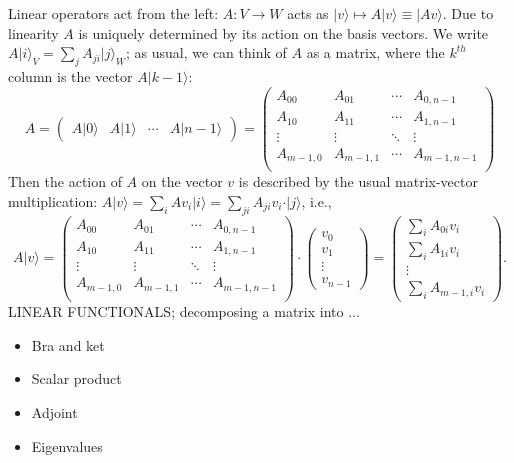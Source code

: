 \documentclass{article}
\theoremstyle{definition}
\newcommand{\ket}[1]{\vert #1 \rangle}
\begin{document}
Linear operators act from the left: $A: V\to W$ acts as $\ket{v}\mapsto A\ket{v} \equiv \ket{Av}$. Due to linearity $A$ is uniquely determined by its action on the basis vectors. We write $A\ket{i}_V = \sum_{j} A_{ji} \ket{j}_W$; as usual, we can think of $A$ as a matrix, where the $k^{th}$ column is the vector $A\ket{k-1}$:
\begin{equation*}
  A = \begin{pmatrix} A\ket{0} & A\ket{1} & \cdots & A\ket{n-1} \end{pmatrix} = 
  \begin{pmatrix}
    A_{00} & A_{01} & \cdots & A_{0, {n-1}} \\
    A_{10} & A_{11} & \cdots & A_{1, {n-1}} \\
    \vdots & \vdots & \ddots & \vdots \\
    A_{m-1,0} & A_{m-1,1} & \cdots & A_{m-1, {n-1}} \\    
  \end{pmatrix}
\end{equation*}
Then the action of $A$ on the vector $v$ is described by the usual matrix-vector multiplication: $A\ket{v} = \sum_{i} A v_i \ket{i} = \sum_{ji} A_{ji} v_i \cdot \ket{j}$, i.e., 
\begin{equation*}
  A \ket{v} = 
  \begin{pmatrix}
    A_{00} & A_{01} & \cdots & A_{0, {n-1}} \\
    A_{10} & A_{11} & \cdots & A_{1, {n-1}} \\
    \vdots & \vdots & \ddots & \vdots \\
    A_{m-1,0} & A_{m-1,1} & \cdots & A_{m-1, {n-1}} \\    
  \end{pmatrix} \cdot \begin{pmatrix} v_0 \\ v_1 \\ \vdots \\ v_{n-1} \end{pmatrix} = 
  \begin{pmatrix} \sum_i A_{0i} v_i \\ \sum_i A_{1i}v_i \\ \vdots \\ \sum_i A_{m-1,i}v_{i} \end{pmatrix}.
\end{equation*}
 {\color{red} LINEAR FUNCTIONALS; decomposing a matrix into ...
}
\begin{itemize}
  \item Bra and ket
  \item Scalar product
  \item Adjoint
  \item Eigenvalues
\end{itemize}
\end{document}
